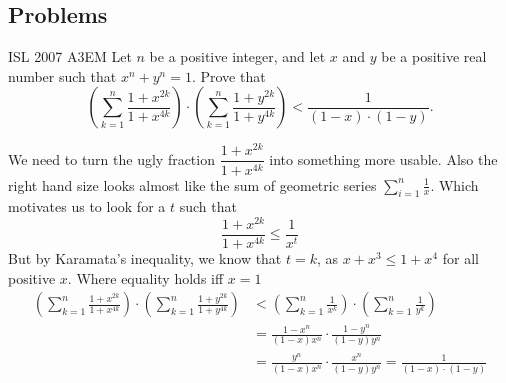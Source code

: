 \newpage\subsection{Problems}



{ISL 2007 A3}{EM}{
    Let $ n$ be a positive integer, and let $ x$ and $ y$ be a positive real
    number such that $ x^n + y^n = 1.$ Prove that
    \[\left(\sum^n_{k = 1} \frac {1 + x^{2k}}{1 + x^{4k}} \right) \cdot
    \left( \sum^n_{k = 1} \frac {1 + y^{2k}}{1 + y^{4k}} \right) < \frac
    {1}{(1 - x) \cdot (1 - y)}. \]
}

\begin{solution}
    We need to turn the ugly fraction $\dfrac{1+x^{2k}}{1+x^{4k}}$ into
    something more usable. Also the right hand size looks almost like the sum
    of geometric series $\sum^{n}_{i=1}\frac{1}{x}$. Which motivates us to
    look for a $t$ such that
    \[\frac{1+x^{2k}}{1+x^{4k}} \le \frac{1}{x^t}\]
    But by Karamata's inequality, we know that $t = k$, as $x + x^3 \le 1 +
    x^4$ for all positive $x$. Where equality holds iff $x=1$
    \[\begin{aligned}
     \left(\sum^n_{k = 1} \frac {1 + x^{2k}}{1 + x^{4k}} \right) \cdot
     \left( \sum^n_{k = 1} \frac {1 + y^{2k}}{1 + y^{4k}} \right)&<
     \left(\sum^{n}_{k=1}\frac{1}{x^k}\right)\cdot
     \left(\sum^{n}_{k=1}\frac{1}{y^k}\right)\\[1em]
     &= \frac{1-x^n}{(1-x)x^n} \cdot \frac{1-y^n}{(1-y)y^n}\\
     &= \frac{y^n}{(1-x)x^n} \cdot \frac{x^n}{(1-y)y^n} =
     \frac{1}{\left(1-x\right)\cdot (1-y)}
    \end{aligned}\]
\end{solution}





